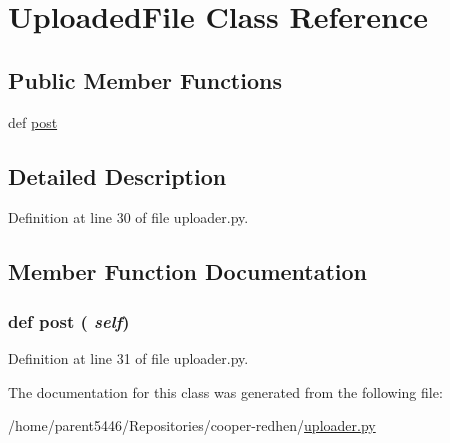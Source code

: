 \hypertarget{classuploader_1_1_uploaded_file}{
\section{UploadedFile Class Reference}
\label{classuploader_1_1_uploaded_file}
}
\subsection*{Public Member Functions}
\begin{DoxyCompactItemize}
\item 
def \hyperlink{classuploader_1_1_uploaded_file_a49eef07c2e643292b02accabc4f0c182}{post}
\end{DoxyCompactItemize}


\subsection{Detailed Description}


Definition at line 30 of file uploader.py.



\subsection{Member Function Documentation}
\hypertarget{classuploader_1_1_uploaded_file_a49eef07c2e643292b02accabc4f0c182}{
\subsubsection[{post}]{\setlength{\rightskip}{0pt plus 5cm}def post ( {\em self})}}
\label{classuploader_1_1_uploaded_file_a49eef07c2e643292b02accabc4f0c182}


Definition at line 31 of file uploader.py.



The documentation for this class was generated from the following file:\begin{DoxyCompactItemize}
\item 
/home/parent5446/Repositories/cooper-\/redhen/\hyperlink{uploader_8py}{uploader.py}\end{DoxyCompactItemize}
